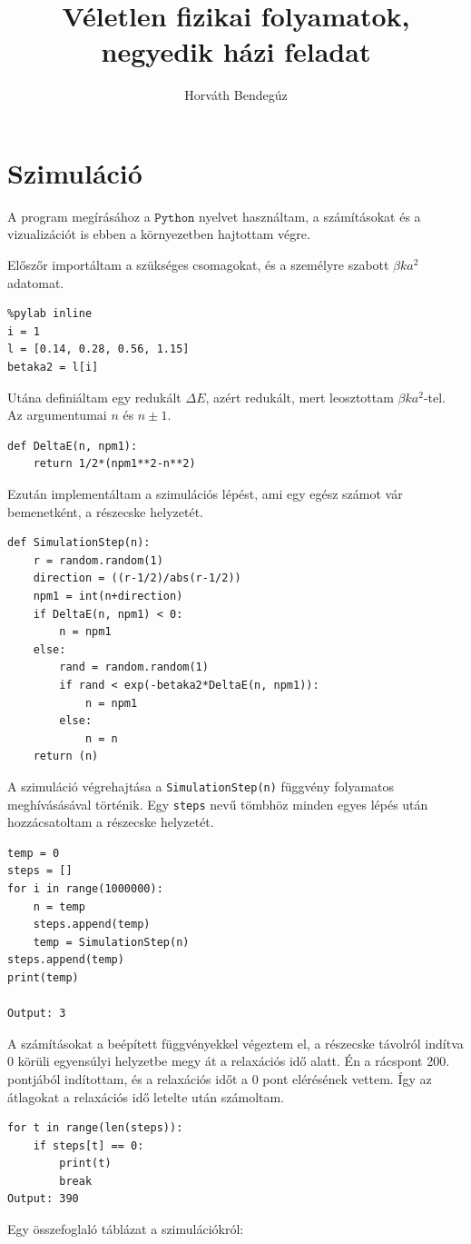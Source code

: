 \documentclass[12pt]{article}
\title{Véletlen fizikai folyamatok, negyedik házi feladat}
\author{Horváth Bendegúz}
\begin{document}

\maketitle
\section*{Szimuláció}
A program megírásához a $\texttt{Python}$ nyelvet használtam, a számításokat és a vizualizációt is ebben a környezetben hajtottam végre.

Előszőr importáltam a szükséges csomagokat, és a személyre szabott $\beta k a^2 $ adatomat.
\begin{lstlisting}
%pylab inline
i = 1
l = [0.14, 0.28, 0.56, 1.15] 
betaka2 = l[i]
\end{lstlisting}
Utána definiáltam egy redukált $\Delta E$, azért redukált, mert leosztottam $\beta k a^2$-tel. Az argumentumai $n$ és $n\pm 1$.
\begin{lstlisting}
def DeltaE(n, npm1):
    return 1/2*(npm1**2-n**2)
\end{lstlisting}
Ezután implementáltam a szimulációs lépést, ami egy egész számot vár bemenetként, a részecske helyzetét.
\begin{lstlisting}
def SimulationStep(n):
    r = random.random(1)
    direction = ((r-1/2)/abs(r-1/2))
    npm1 = int(n+direction)
    if DeltaE(n, npm1) < 0:
        n = npm1
    else:
        rand = random.random(1)
        if rand < exp(-betaka2*DeltaE(n, npm1)):
            n = npm1
        else:
            n = n
    return (n)
\end{lstlisting}
A szimuláció végrehajtása a \texttt{SimulationStep(n)} függvény folyamatos meghívásásával történik. Egy \texttt{steps} nevű tömbhöz minden egyes lépés után hozzácsatoltam a részecske helyzetét.
\begin{lstlisting}
temp = 0
steps = []
for i in range(1000000):
    n = temp
    steps.append(temp)
    temp = SimulationStep(n)
steps.append(temp)
print(temp)

Output: 3
\end{lstlisting}

A számításokat a beépített függvényekkel végeztem el, a részecske távolról indítva 0 körüli egyensúlyi helyzetbe megy át a relaxációs idő alatt. Én a rácspont 200. pontjából indítottam, és a relaxációs időt a 0 pont elérésének vettem. Így az átlagokat a relaxációs idő letelte után számoltam.
\begin{lstlisting}
for t in range(len(steps)):
    if steps[t] == 0:
        print(t)
        break
Output: 390
\end{lstlisting}
Egy összefoglaló táblázat a szimulációkról:
\end{document}
